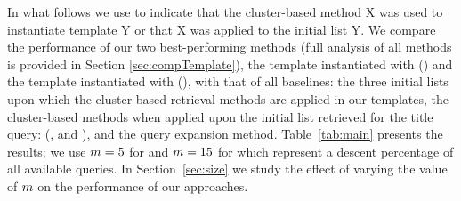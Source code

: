 %

In what follows we use  to indicate that the cluster-based method X was used to instantiate template Y or that X was applied to the initial list Y.
We compare the performance of our two best-performing methods (full analysis of all methods is provided in Section \ref{sec:compTemplate}), the \clustFuse template instantiated with \clustMRF (\inst{\clustMRF}{\clustFuse}) and the \queryCat template instantiated with \interp (\inst{\interp}{\queryCat}), with that of all  baselines: the three initial lists upon which the cluster-based retrieval methods are applied in our templates, the cluster-based methods when applied upon the initial list retrieved for the title query: (\inst{\clustMRF}{\titleQuery}, \inst{\geoClust}{\titleQuery} and \inst{\interp}{\titleQuery}), and the \ariRM query expansion method. Table~\ref{tab:main} presents the results; we use $m=5$ for \robust and $m=15$ for \cw which represent a descent percentage of all available queries. In Section~\ref{sec:size} we study the effect of varying the value of $m$ on the performance of our approaches.

